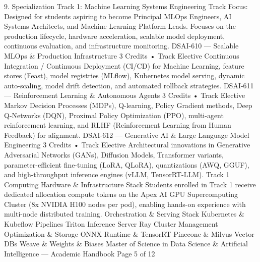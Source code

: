 \documentclass[12pt]{article}
\begin{document}
9. Specialization Track 1: Machine Learning Systems Engineering
Track Focus: Designed for students aspiring to become Principal MLOps Engineers, AI Systems Architects, and
Machine Learning Platform Leads. Focuses on the production lifecycle, hardware acceleration, scalable model
deployment, continuous evaluation, and infrastructure monitoring.
DSAI-610 — Scalable MLOps \& Production Infrastructure
3 Credits • Track Elective
Continuous Integration / Continuous Deployment (CI/CD) for Machine Learning, feature stores (Feast), model
registries (MLflow), Kubernetes model serving, dynamic auto-scaling, model drift detection, and automated
rollback strategies.
DSAI-611 — Reinforcement Learning \& Autonomous Agents
3 Credits • Track Elective
Markov Decision Processes (MDPs), Q-learning, Policy Gradient methods, Deep Q-Networks (DQN), Proximal
Policy Optimization (PPO), multi-agent reinforcement learning, and RLHF (Reinforcement Learning from Human
Feedback) for alignment.
DSAI-612 — Generative AI \& Large Language Model Engineering
3 Credits • Track Elective
Architectural innovations in Generative Adversarial Networks (GANs), Diffusion Models, Transformer variants,
parameter-efficient fine-tuning (LoRA, QLoRA), quantizations (AWQ, GGUF), and high-throughput inference
engines (vLLM, TensorRT-LLM).
Track 1 Computing Hardware \& Infrastructure Stack
Students enrolled in Track 1 receive dedicated allocation compute tokens on the Apex AI GPU Supercomputing
Cluster (8x NVIDIA H100 nodes per pod), enabling hands-on experience with multi-node distributed training.
Orchestration \& Serving Stack
Kubernetes \& Kubeflow Pipelines
Triton Inference Server
Ray Cluster Management
Optimization \& Storage
ONNX Runtime \& TensorRT
Pinecone \& Milvus Vector DBs
Weave \& Weights \& Biases
Master of Science in Data Science \& Artificial Intelligence — Academic Handbook
Page 5 of 12
\end{document}
